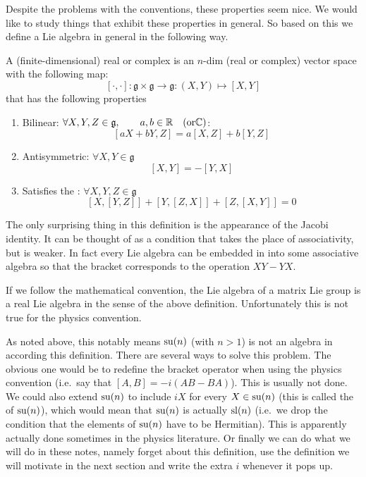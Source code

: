 Despite the problems with the conventions, these properties seem nice. We would like to study things that exhibit these properties in general. So based on this we define a Lie algebra in general in the following way.

\begin{definition}
A (finite-dimensional) real or complex  is an $n$-dim (real or complex) vector space with the following map:
\[[\cdot,\cdot]: \mathfrak{g}\times\mathfrak{g} \to \mathfrak{g}: (X,Y) \mapsto [X,Y]\]
that has the following properties
\begin{enumerate}
\item Bilinear: $\forall X,Y,Z \in \mathfrak{g}, \qquad a,b \in \mathbb{R} \quad (\text{or} \mathbb{C})$:
\[ [aX + bY, Z] = a[X,Z] + b[Y,Z] \]
\item Antisymmetric: $\forall X,Y \in \mathfrak{g}$
\[ [X,Y] = -[Y,X] \]
\item Satisfies the : $\forall X,Y,Z \in \mathfrak{g}$
\[ [X,[Y,Z]] + [Y,[Z,X]] + [Z,[X,Y]] = 0 \]
\end{enumerate}
\end{definition}
The only surprising thing in this definition is the appearance of the Jacobi identity. It can be thought of as a condition that takes the place of associativity, but is weaker. In fact every Lie algebra can be embedded in into some associative algebra so that the bracket corresponds to the operation $XY - YX$. 

If we follow the mathematical convention, the Lie algebra of a matrix Lie group is a real Lie algebra in the sense of the above definition. Unfortunately this is not true for the physics convention.

As noted above, this notably means $\operatorname{su}(n)$ (with $n>1$) is not an algebra in according this definition. There are several ways to solve this problem. The obvious one would be to redefine the bracket operator when using the physics convention (i.e.\ say that $[A,B] = -i \left(AB - BA\right)$). This is usually not done. We could also extend $\operatorname{su}(n)$ to include $iX$ for every $X \in \operatorname{su}(n)$ (this is called the  of $\operatorname{su}(n)$), which would mean that $\operatorname{su}(n)$ is actually $\operatorname{sl}(n)$ (i.e.\ we drop the condition that the elements of $\operatorname{su}(n)$ have to be Hermitian). This is apparently actually done sometimes in the physics literature. Or finally we can do what we will do in these notes, namely forget about this definition, use the definition we will motivate in the next section and write the extra $i$ whenever it pops up.

